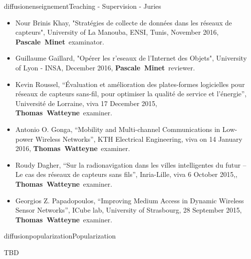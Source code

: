 \documentclass{ra2016}
\newcommand{\pascale}          {\textbf{Pascale~Minet}}
\newcommand{\thomas}           {\textbf{Thomas~Watteyne}}
\begin{document}
\begin{module}{diffusion}{enseignement}{Teaching - Supervision - Juries}
\begin{itemize}
\begin{itemize}
          	\item Nour Brinis Khay, "Strat\'egies de collecte de donn\'ees dans les r\'eseaux de capteurs", University of La Manouba, ENSI, Tunis, November 2016, \pascale~examinator.
          	\item Guillaume Gaillard, "Op\'erer les r'eseaux de l'Internet des Objets", University of Lyon - INSA, December 2016, \pascale~reviewer. 
            \item Kevin Roussel, ``\'Evaluation et am\'elioration des plates-formes logicielles pour r\'eseaux de capteurs sans-fil, pour optimiser la qualit\'e de service et l'\'energie'', Universit\'e de Lorraine, viva 17 December 2015, \thomas~examiner.
            \item Antonio O. Gonga, ``Mobility and Multi-channel Communications in Low-power Wireless Networks'', KTH Electrical Engineering, viva on 14 January 2016, \thomas~examiner.
            \item Roudy Dagher, ``Sur la radionavigation dans les villes intelligentes du futur – Le cas des r\'eseaux de capteurs sans fils'', Inria-Lille, viva  6 October 2015,, \thomas~examiner.
            \item Georgios Z. Papadopoulos, ``Improving Medium Access in Dynamic Wireless Sensor Networks'', ICube lab, University of Strasbourg, 28 September 2015, \thomas~examiner.
        \end{itemize}
\end{itemize}



\end{module}

\begin{module}{diffusion}{popularization}{Popularization}

TBD 


\end{module}


\end{document}
